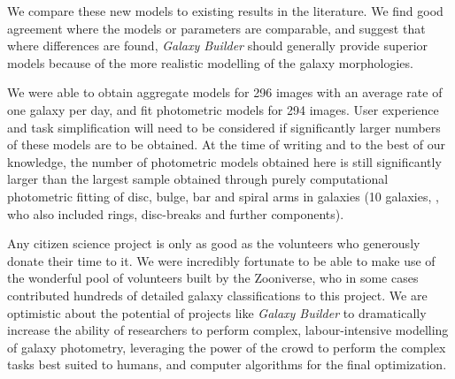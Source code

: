 \documentclass[../main.tex]{subfiles}
\begin{document}
We compare these new models to existing results in the literature. We find good agreement where the models or parameters are comparable, and suggest that where differences are found, \textit{Galaxy Builder} should generally provide superior models because of the more realistic modelling of the galaxy morphologies.

We were able to obtain aggregate models for 296 images with an average rate of one galaxy per day, and fit photometric models for 294 images. User experience and task simplification will need to be considered if significantly larger numbers of these models are to be obtained. At the time of writing and to the best of our knowledge, the number of photometric models obtained here is still significantly larger than the largest sample obtained through purely computational photometric fitting of disc, bulge, bar and spiral arms in galaxies (10 galaxies, \citealt{Gao2017:1709.00746v1}, who also included rings, disc-breaks and further components).

Any citizen science project is only as good as the volunteers who generously donate their time to it. We were incredibly fortunate to be able to make use of the wonderful pool of volunteers built by the Zooniverse, who in some cases contributed hundreds of detailed galaxy classifications to this project. We are optimistic about the potential of projects like \textit{Galaxy Builder} to dramatically increase the ability of researchers to perform complex, labour-intensive modelling of galaxy photometry, leveraging the power of the crowd to perform the complex tasks best suited to humans, and computer algorithms for the final optimization.
\end{document}
